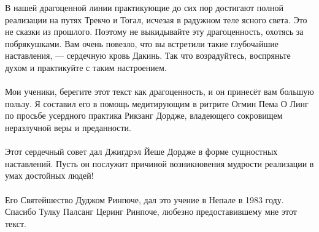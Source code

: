 \newpage
В нашей драгоценной линии практикующие до сих пор достигают полной реализации на путях Трекчо и Тогал, исчезая в радужном теле ясного света. Это не сказки из прошлого. Поэтому не выкидывайте эту драгоценность, охотясь за побрякушками. Вам очень повезло, что вы встретили такие глубочайшие наставления, — сердечную кровь Дакинь. Так что возрадуйтесь, воспряньте духом и практикуйте с таким настроением.
\\ \\ Мои ученики, берегите этот текст как драгоценность, и он принесёт вам большую пользу. Я составил его в помощь медитирующим в ритрите Огмин Пема О Линг по просьбе усердного практика Рикзанг Дордже, владеющего сокровищем неразлучной веры и преданности.
\\ \\ Этот сердечный совет дал Джигдрэл Йеше Дордже в форме сущностных наставлений. Пусть он послужит причиной возникновения мудрости реализации в умах достойных людей!
\\
\\
\scriptsize
Его Святейшество Дуджом Ринпоче, дал это учение в Непале в 1983 году.
Спасибо Тулку Палсанг Церинг Ринпоче, любезно предоставившему мне этот текст.
\normalsize

